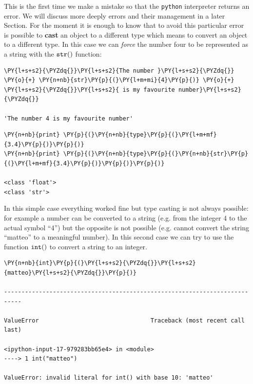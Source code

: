 This is the first time we make a mistake so that the \texttt{python} interpreter returns an error. We will 
discuss more deeply errors and their management in a later Section. 
For the moment it is enough to know that to avoid this particular error is possible to \textbf{cast} an object to a 
different type which means to convert an object to a different type. In this case we can \emph{force} the number four to be represented as a string with the \(\tt{str()}\) function:

\begin{tcolorbox}[breakable, size=fbox, boxrule=1pt, pad at break*=1mm, colback=cellbackground, colframe=cellborder]            
\begin{Verbatim}[commandchars=\\\{\}]
\PY{l+s+s2}{\PYZdq{}}\PY{l+s+s2}{The number }\PY{l+s+s2}{\PYZdq{}} \PY{o}{+} \PY{n+nb}{str}\PY{p}{(}\PY{l+m+mi}{4}\PY{p}{)} \PY{o}{+} \PY{l+s+s2}{\PYZdq{}}\PY{l+s+s2}{ is my favourite number}\PY{l+s+s2}{\PYZdq{}}

'The number 4 is my favourite number'
\end{Verbatim}
\end{tcolorbox}

\begin{tcolorbox}[breakable, size=fbox, boxrule=1pt, pad at break*=1mm, colback=cellbackground, colframe=cellborder]            
\begin{Verbatim}[commandchars=\\\{\}]
\PY{n+nb}{print} \PY{p}{(}\PY{n+nb}{type}\PY{p}{(}\PY{l+m+mf}{3.4}\PY{p}{)}\PY{p}{)}
\PY{n+nb}{print} \PY{p}{(}\PY{n+nb}{type}\PY{p}{(}\PY{n+nb}{str}\PY{p}{(}\PY{l+m+mf}{3.4}\PY{p}{)}\PY{p}{)}\PY{p}{)}

<class 'float'>
<class 'str'>
\end{Verbatim}
\end{tcolorbox}

In this simple case everything worked fine but type casting is not always possible: for example a number can be converted to a string (e.g. from the integer 4 to the actual symbol ``4'') but the opposite is not possible (e.g. cannot convert the string ``matteo'' to a meaningful number). In this second case we can try to use the function \(\tt{int()}\) to convert a string to an integer.

\begin{tcolorbox}[breakable, size=fbox, boxrule=1pt, pad at break*=1mm, colback=cellbackground, colframe=cellborder]            
\begin{Verbatim}[commandchars=\\\{\}]
\PY{n+nb}{int}\PY{p}{(}\PY{l+s+s2}{\PYZdq{}}\PY{l+s+s2}{matteo}\PY{l+s+s2}{\PYZdq{}}\PY{p}{)}

---------------------------------------------------------------------------

ValueError                                Traceback (most recent call last)

<ipython-input-17-979283bb65e4> in <module>
----> 1 int("matteo")  

ValueError: invalid literal for int() with base 10: 'matteo'
\end{Verbatim}
\end{tcolorbox}

